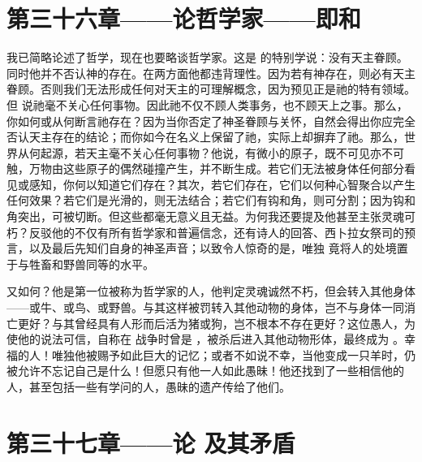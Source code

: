 
\section{第三十六章——论哲学家——即和}

我已简略论述了哲学，现在也要略谈哲学家。这是  的特别学说：没有天主眷顾。同时他并不否认神的存在。在两方面他都违背理性。因为若有神存在，则必有天主眷顾。否则我们无法形成任何对天主的可理解概念，因为预见正是祂的特有领域。但  说祂毫不关心任何事物。因此祂不仅不顾人类事务，也不顾天上之事。那么，你如何或从何断言祂存在？因为当你否定了神圣眷顾与关怀，自然会得出你应完全否认天主存在的结论；而你如今在名义上保留了祂，实际上却摒弃了祂。那么，世界从何起源，若天主毫不关心任何事物？他说，有微小的原子，既不可见亦不可触，万物由这些原子的偶然碰撞产生，并不断生成。若它们无法被身体任何部分看见或感知，你何以知道它们存在？其次，若它们存在，它们以何种心智聚合以产生任何效果？若它们是光滑的，则无法结合；若它们有钩和角，则可分割；因为钩和角突出，可被切断。但这些都毫无意义且无益。为何我还要提及他甚至主张灵魂可朽？反驳他的不仅有所有哲学家和普遍信念，还有诗人的回答、西卜拉女祭司的预言，以及最后先知们自身的神圣声音；以致令人惊奇的是，唯独  竟将人的处境置于与牲畜和野兽同等的水平。\par

 又如何？他是第一位被称为哲学家的人，他判定灵魂诚然不朽，但会转入其他身体——或牛、或鸟、或野兽。与其这样被罚转入其他动物的身体，岂不与身体一同消亡更好？与其曾经具有人形而后活为猪或狗，岂不根本不存在更好？这位愚人，为使他的说法可信，自称在  战争时曾是 ，被杀后进入其他动物形体，最终成为 。幸福的人！唯独他被赐予如此巨大的记忆；或者不如说不幸，当他变成一只羊时，仍被允许不忘记自己是什么！但愿只有他一人如此愚昧！他还找到了一些相信他的人，甚至包括一些有学问的人，愚昧的遗产传给了他们。\par


\section{第三十七章——论  及其矛盾}

